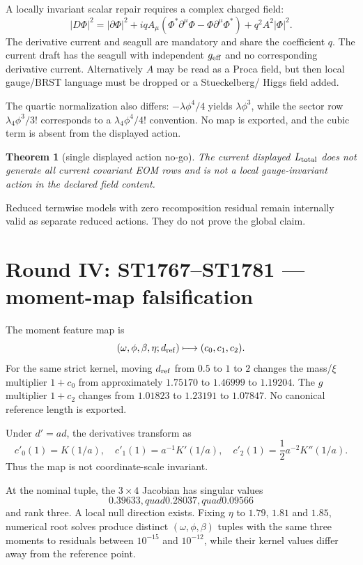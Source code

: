\documentclass[11pt,a4paper]{article}
\newtheorem{theorem}{Theorem}\newcommand{\status}[1]{\textsf{[#1]}}
\begin{document}
A locally invariant scalar repair requires a complex charged field:
\[
|D\Phi|^2=|\partial\Phi|^2
+iqA_\mu(\Phi^*\partial^\mu\Phi-\Phi\partial^\mu\Phi^*)
+q^2A^2|\Phi|^2.
\]
The derivative current and seagull are mandatory and share the coefficient
$q$.  The current draft has the seagull with independent $g_{\rm eff}$ and no
corresponding derivative current.  Alternatively $A$ may be read as a Proca
field, but then local gauge/BRST language must be dropped or a Stueckelberg/
Higgs field added.

The quartic normalization also differs: $-\lambda\phi^4/4$ yields
$\lambda\phi^3$, while the sector row $\lambda_4\phi^3/3!$ corresponds to a
$\lambda_4\phi^4/4!$ convention.  No map is exported, and the cubic term is
absent from the displayed action.

\begin{theorem}[single displayed action no-go]
The current displayed $L_{\rm total}$ does not generate all current covariant
EOM rows and is not a local gauge-invariant action in the declared field
content.
\end{theorem}

Reduced termwise models with zero recomposition residual remain internally
valid as separate reduced actions.  They do not prove the global claim.

\section{Round IV: ST1767--ST1781 --- moment-map falsification}

The moment feature map is
\[
(\omega,\phi,\beta,\eta;d_{\rm ref})
\longmapsto(c_0,c_1,c_2).
\]
For the same strict kernel, moving $d_{\rm ref}$ from $0.5$ to $1$ to $2$
changes the mass/$\xi$ multiplier $1+c_0$ from approximately
$1.75170$ to $1.46999$ to $1.19204$.  The $g$ multiplier $1+c_2$ changes from
$1.01823$ to $1.23191$ to $1.07847$.  No canonical reference length is
exported.

Under $d'=ad$, the derivatives transform as
\[
c'_0(1)=K(1/a),\quad
c'_1(1)=a^{-1}K'(1/a),\quad
c'_2(1)=\frac12a^{-2}K''(1/a).
\]
Thus the map is not coordinate-scale invariant.

At the nominal tuple, the $3\times4$ Jacobian has singular values
\[
0.39633,quad0.28037,quad0.09566
\]
and rank three.  A local null direction exists.  Fixing $\eta$ to $1.79$,
$1.81$ and $1.85$, numerical root solves produce distinct
$(\omega,\phi,\beta)$ tuples with the same three moments to residuals between
$10^{-15}$ and $10^{-12}$, while their kernel values differ away from the
reference point.
\end{document}
